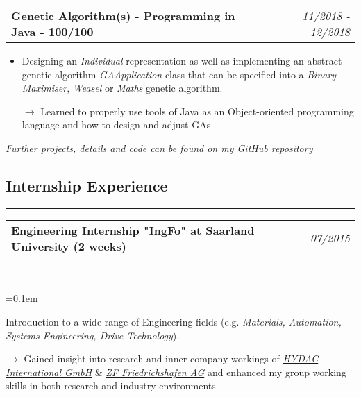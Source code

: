 \documentclass[10pt,letterpaper]{article}
\makeatletter
\newcommand{\headerrow}[2]
{\begin{tabular*}{\linewidth}{l@{\extracolsep{\fill}}r}
	#1 &
	#2 \\
\end{tabular*}}
\makeatother
\begin{document}
\noindent
\headerrow{\textbf{Genetic Algorithm(s) - Programming in Java - 100/100}}{\emph{11/2018 - 12/2018}}
\vspace{-1.6em}
\begin{itemize}
    \setlength\itemsep{0em}
    \item Designing an \emph{Individual} representation as well as implementing an abstract genetic algorithm \emph{GAApplication} class that can be specified into a \emph{Binary Maximiser}, \emph{Weasel} or \emph{Maths} genetic algorithm.
    \item[$\rightarrow$] Learned to properly use tools of Java as an Object-oriented programming language and how to design and adjust GAs
\end{itemize}
\vspace{0.4em}
\emph{Further projects, details and code can be found on my \href{https://github.com/j0ner0n}{\underline{GitHub repository}}}

\subsection*{Internship Experience}
\hrule
\vspace{0.4em}

\noindent
\headerrow{\textbf{Engineering Internship "IngFo" at Saarland University (2 weeks)}}{\emph{07/2015}}
\\
\vspace{-1.6em}
\begin{itemize*}
    \parskip=0.1em
    \item Introduction to a wide range of Engineering fields (e.g. \emph{Materials, Automation, Systems Engineering, Drive Technology}).
	\item[$\rightarrow$] Gained insight into research and inner company workings of \href{https://www.hydac.com/uk-en/start.html}{\emph{HYDAC International GmbH}} \& \href{https://www.zf.com/mobile/en/homepage/homepage.html}{\emph{ZF Friedrichshafen AG}} and enhanced my group working skills in both research and industry environments
\end{itemize*}
\end{document}
